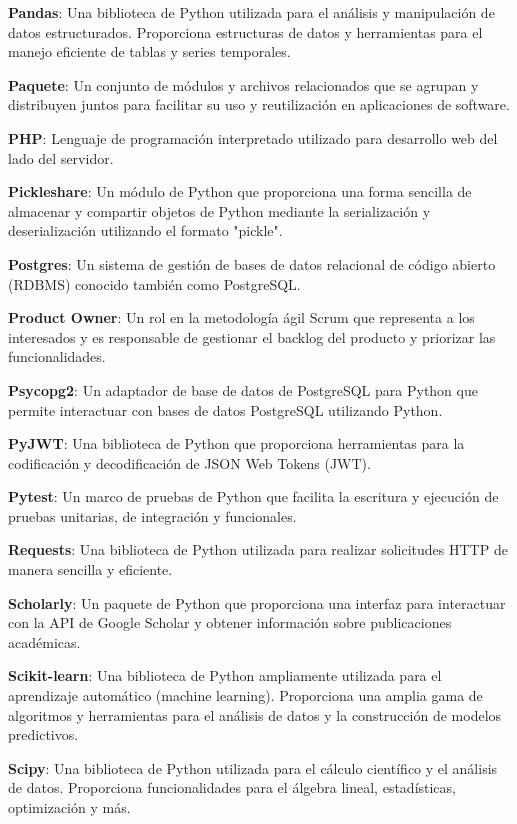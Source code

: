 \textbf{Pandas}: Una biblioteca de Python utilizada para el análisis y manipulación de datos estructurados. Proporciona estructuras de datos y herramientas para el manejo eficiente de tablas y series temporales.

\textbf{Paquete}: Un conjunto de módulos y archivos relacionados que se agrupan y distribuyen juntos para facilitar su uso y reutilización en aplicaciones de software.

\textbf{PHP}: Lenguaje de programación interpretado utilizado para desarrollo web del lado del servidor.

\textbf{Pickleshare}: Un módulo de Python que proporciona una forma sencilla de almacenar y compartir objetos de Python mediante la serialización y deserialización utilizando el formato "pickle".

\textbf{Postgres}: Un sistema de gestión de bases de datos relacional de código abierto (RDBMS) conocido también como PostgreSQL.

\textbf{Product Owner}: Un rol en la metodología ágil Scrum que representa a los interesados y es responsable de gestionar el backlog del producto y priorizar las funcionalidades.

\textbf{Psycopg2}: Un adaptador de base de datos de PostgreSQL para Python que permite interactuar con bases de datos PostgreSQL utilizando Python.

\textbf{PyJWT}: Una biblioteca de Python que proporciona herramientas para la codificación y decodificación de JSON Web Tokens (JWT).

\textbf{Pytest}: Un marco de pruebas de Python que facilita la escritura y ejecución de pruebas unitarias, de integración y funcionales.

\textbf{Requests}: Una biblioteca de Python utilizada para realizar solicitudes HTTP de manera sencilla y eficiente.

\textbf{Scholarly}: Un paquete de Python que proporciona una interfaz para interactuar con la API de Google Scholar y obtener información sobre publicaciones académicas.

\textbf{Scikit-learn}: Una biblioteca de Python ampliamente utilizada para el aprendizaje automático (machine learning). Proporciona una amplia gama de algoritmos y herramientas para el análisis de datos y la construcción de modelos predictivos.

\textbf{Scipy}: Una biblioteca de Python utilizada para el cálculo científico y el análisis de datos. Proporciona funcionalidades para el álgebra lineal, estadísticas, optimización y más.

